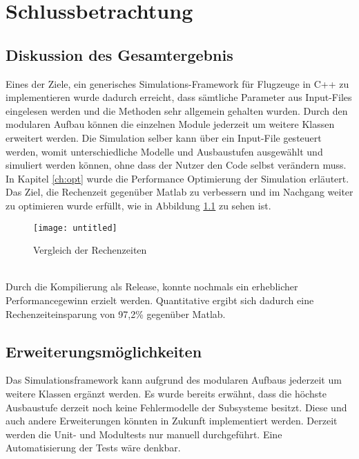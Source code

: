 \chapter{Schlussbetrachtung}
\section{Diskussion des Gesamtergebnis}
Eines der Ziele, ein generisches Simulations-Framework für Flugzeuge in C++ zu implementieren wurde dadurch erreicht, dass sämtliche Parameter aus Input-Files eingelesen werden und die Methoden sehr allgemein gehalten wurden. Durch den modularen Aufbau können die einzelnen Module jederzeit um weitere Klassen erweitert werden. Die Simulation selber kann über ein Input-File gesteuert werden, womit unterschiedliche Modelle und Ausbaustufen ausgewählt und simuliert werden können, ohne dass der Nutzer den Code selbst verändern muss. In Kapitel \ref{ch:opt} wurde die Performance Optimierung der Simulation erläutert. Das Ziel, die Rechenzeit gegenüber Matlab  zu verbessern und im Nachgang weiter zu optimieren wurde erfüllt, wie in Abbildung \ref{fig:optergeb} zu sehen ist. 
\begin{figure}[h]
	\centering
	\texttt{[image: untitled]}
	\caption{Vergleich der Rechenzeiten}
	\label{fig:optergeb}
\end{figure}\noindent\\
Durch die Kompilierung als Release, konnte nochmals ein erheblicher Performancegewinn erzielt werden. Quantitative ergibt sich dadurch eine Rechenzeiteinsparung von 97,2\% gegenüber Matlab.
\section{Erweiterungsmöglichkeiten}
Das Simulationsframework kann aufgrund des modularen Aufbaus jederzeit um weitere Klassen ergänzt werden. Es wurde bereits erwähnt, dass die höchste Ausbaustufe derzeit noch keine Fehlermodelle der Subsysteme besitzt. Diese und auch andere Erweiterungen könnten in Zukunft implementiert werden. Derzeit werden die Unit- und Modultests nur manuell durchgeführt. Eine Automatisierung der Tests wäre denkbar. 
